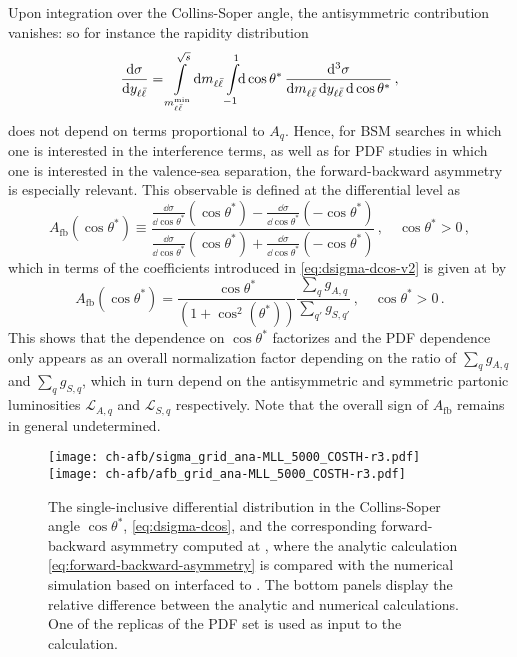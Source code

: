 Upon integration over the Collins-Soper angle, the
antisymmetric contribution vanishes: so for instance the
rapidity distribution
\begin{equation}
  \label{eq:dsigma-dyll}
  \frac{\dd\sigma}{\dd y_{\ell\bar{\ell}}} = \int\limits_{m_{\ell\bar{\ell}}^{\text{min}}}^{\sqrt s}\!\dd m_{\ell\bar{\ell}} \int\limits_{-1}^{1}\!\!\dd\cos\theta^*\, \frac{\dd^3 \sigma}{\dd m_{\ell\bar{\ell}} \, \dd y_{\ell\bar{\ell}} \, \dd\cos\theta^*} \, ,
\end{equation}
does not depend on terms proportional to $A_q$.
%
Hence, for BSM searches in which one is
interested in the interference terms, as well as for PDF studies in which one is
interested in the valence-sea separation, the forward-backward
asymmetry is especially relevant.
%
This observable is
defined at the differential level as
\begin{equation}
  A_{\text{fb}}(\cos\theta^*) \equiv \frac{ \frac{\dd\sigma}{\dd\cos\theta^*}(\cos\theta^*)
  - \frac{\dd\sigma}{\dd\cos\theta^*}(-\cos\theta^*)}{ \frac{\dd\sigma}{\dd\cos\theta^*}(\cos\theta^*)
  + \frac{\dd\sigma}{\dd\cos\theta^*}(-\cos\theta^*) } \, ,\quad \cos\theta^*>0 \, ,
  \label{eq:forward-backward-asymmetry}
\end{equation}
which in terms of the coefficients introduced in
\cref{eq:dsigma-dcos-v2} is given at \lo by
\begin{equation}
  \label{eq:afb_lo}
  A_{\text{fb}}(\cos\theta^*)   = \frac{\cos\theta^*}{(1+\cos^2(\theta^*))}\frac{\sum_q g_{A,q} }{\sum_{q'} g_{S,q'}} \, ,\quad \cos\theta^*>0 \,.
\end{equation}
This  shows that the dependence on $\cos\theta^*$ factorizes
and the PDF dependence only appears as an overall normalization factor
depending on the ratio of $\sum_q g_{A,q}$
and $\sum_q g_{S,q}$, which in turn depend on the antisymmetric and symmetric
partonic luminosities $ \mathcal{L}_{A,q}$ and $ \mathcal{L}_{S,q}$ respectively.
%
Note that the overall sign of $A_{\text{fb}}$ remains in general undetermined.

\begin{figure}[t]
  \centering
  \texttt{[image: ch-afb/sigma\_grid\_ana-MLL\_5000\_COSTH-r3.pdf]}
  \texttt{[image: ch-afb/afb\_grid\_ana-MLL\_5000\_COSTH-r3.pdf]}
  \caption{The single-inclusive differential distribution in
    the Collins-Soper angle $\cos\theta^*$,
    \cref{eq:dsigma-dcos},
    and the corresponding forward-backward asymmetry computed at \lo,
    where the analytic calculation  \cref{eq:forward-backward-asymmetry}
    is compared with the numerical simulation based on 
    \mgamc
    interfaced to \pineappl.
    The bottom panels display the relative difference between the analytic and
    numerical calculations.
    One of the replicas of the  \nnlo PDF set is used as input
    to the calculation.
  }    
  \label{fig:lo-diff-cos}
\end{figure}

